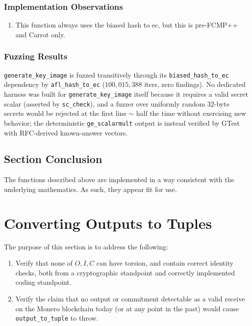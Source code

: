 \documentclass[12pt,titlepage,table]{article}
\begin{document}
\subsubsection{Implementation Observations}
\begin{enumerate}
    \item This function always uses the biased hash to ec, but this is pre-FCMP++ and Carrot only.
\end{enumerate}

\subsubsection{Fuzzing Results}
\verb+generate_key_image+ is fuzzed transitively through its \verb+biased_hash_to_ec+ dependency by \verb+afl_hash_to_ec+ ($100{,}015{,}388$ iters, zero findings).  No dedicated harness was built for \verb+generate_key_image+ itself because it requires a valid secret scalar (asserted by \verb+sc_check+), and a fuzzer over uniformly random $32$-byte secrets would be rejected at the first line $\sim$ half the time without exercising new behavior; the deterministic \verb+ge_scalarmult+ output is instead verified by GTest with RFC-derived known-answer vectors.


\subsection[Section Conclusion]{Section Conclusion \hfill \checkmark}
The functions described above are implemented in a way consistent with the underlying mathematics. As such, they appear fit for use.


\newpage

\section{Converting Outputs to Tuples}
The purpose of this section is to address the following:
\begin{enumerate}
    \item Verify that none of $O,I,C$ can have torsion, and contain correct identity checks, both from a cryptographic standpoint and correctly implemented coding standpoint.
    \item Verify the claim that no output or commitment detectable as a valid receive on the Monero blockchain today (or at any point in the past) would cause \verb+output_to_tuple+ to throw.
\end{enumerate}
\end{document}
